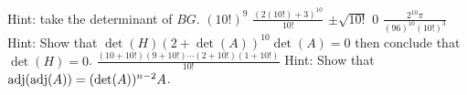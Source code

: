 \begin{Answer}
\begin{multicols}{2}
\Question Hint: take the determinant of $BG$.
\Question $(10!)^9$
\Question $\frac{(2(10!)+3)^{10}}{10!}$
\Question $\pm\sqrt{10!}$
\Question $0$
\Question $\frac{2^{10}\pi}{(96)^{10}(10!)^3}$
\Question Hint: Show that $\det(H)(2+\det(A))^{10}\det(A)=0$ then conclude that $\det(H)=0$.
\Question $\frac{(10+10!)(9+10!)\cdots(2+10!)(1+10!)}{10!}$
\Question Hint: Show that $\operatorname{adj}(\operatorname{adj}(A))=(\det(A))^{n-2}A$.
\EndCurrentQuestion
\end{multicols}
\end{Answer}
